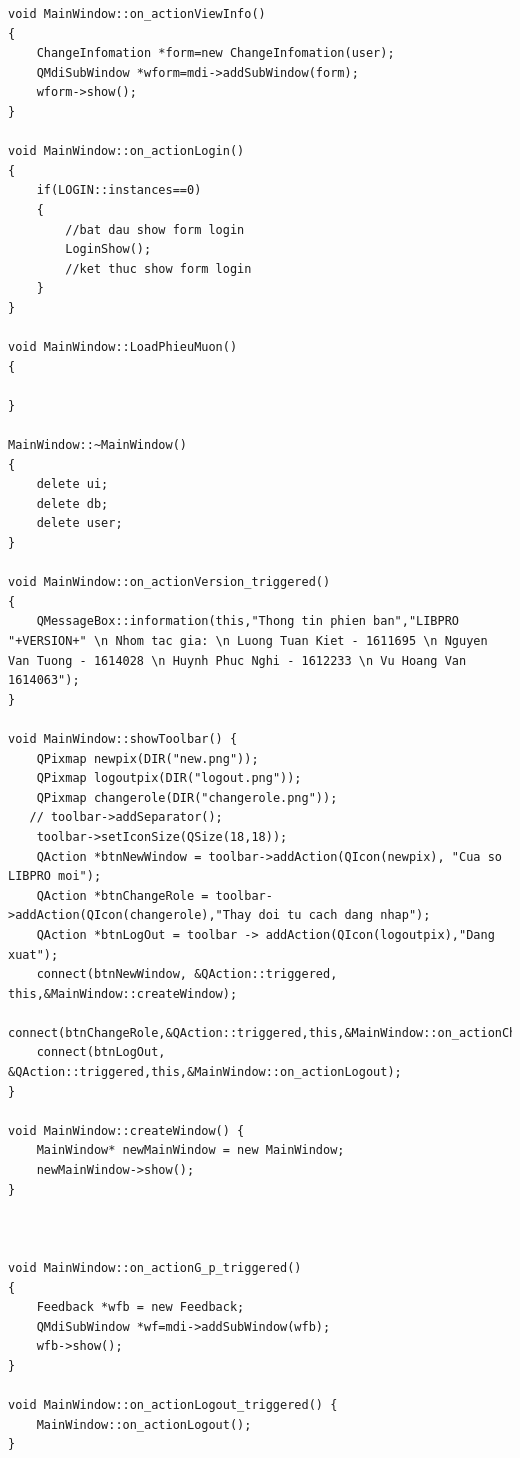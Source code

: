 \documentclass[a4paper]{article}
\begin{document}
\begin{lstlisting}
void MainWindow::on_actionViewInfo()
{
    ChangeInfomation *form=new ChangeInfomation(user);
    QMdiSubWindow *wform=mdi->addSubWindow(form);
    wform->show();
}

void MainWindow::on_actionLogin()
{
    if(LOGIN::instances==0)
    {
        //bat dau show form login
        LoginShow();
        //ket thuc show form login
    }
}

void MainWindow::LoadPhieuMuon()
{

}

MainWindow::~MainWindow()
{
    delete ui;
    delete db;
    delete user;
}

void MainWindow::on_actionVersion_triggered()
{
    QMessageBox::information(this,"Thong tin phien ban","LIBPRO "+VERSION+" \n Nhom tac gia: \n Luong Tuan Kiet - 1611695 \n Nguyen Van Tuong - 1614028 \n Huynh Phuc Nghi - 1612233 \n Vu Hoang Van 1614063");
}

void MainWindow::showToolbar() {
    QPixmap newpix(DIR("new.png"));
    QPixmap logoutpix(DIR("logout.png"));
    QPixmap changerole(DIR("changerole.png"));
   // toolbar->addSeparator();
    toolbar->setIconSize(QSize(18,18));
    QAction *btnNewWindow = toolbar->addAction(QIcon(newpix), "Cua so LIBPRO moi");
    QAction *btnChangeRole = toolbar->addAction(QIcon(changerole),"Thay doi tu cach dang nhap");
    QAction *btnLogOut = toolbar -> addAction(QIcon(logoutpix),"Dang xuat");
    connect(btnNewWindow, &QAction::triggered, this,&MainWindow::createWindow);
    connect(btnChangeRole,&QAction::triggered,this,&MainWindow::on_actionChangeRole);
    connect(btnLogOut, &QAction::triggered,this,&MainWindow::on_actionLogout);
}

void MainWindow::createWindow() {
    MainWindow* newMainWindow = new MainWindow;
    newMainWindow->show();
}



void MainWindow::on_actionG_p_triggered()
{
    Feedback *wfb = new Feedback;
    QMdiSubWindow *wf=mdi->addSubWindow(wfb);
    wfb->show();
}

void MainWindow::on_actionLogout_triggered() {
    MainWindow::on_actionLogout();
}

\end{lstlisting}
\end{document}
